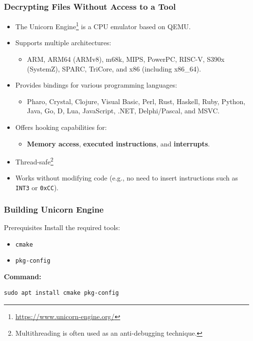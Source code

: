 \begin{frame}
    \frametitle{Decrypting Files Without Access to a Tool}
    \begin{itemize}
        \item The Unicorn Engine\footnote{\url{https://www.unicorn-engine.org/}} is a CPU emulator based on QEMU.
        \item Supports multiple architectures:
        \begin{itemize}
            \item ARM, ARM64 (ARMv8), m68k, MIPS, PowerPC, RISC-V, S390x (SystemZ), SPARC, TriCore, and x86 (including x86\_64).
        \end{itemize}
        \item Provides bindings for various programming languages:
        \begin{itemize}
            \item Pharo, Crystal, Clojure, Visual Basic, Perl, Rust, Haskell, Ruby, Python, Java, Go, D, Lua, JavaScript, .NET, Delphi/Pascal, and MSVC.
        \end{itemize}
        \item Offers hooking capabilities for:
        \begin{itemize}
            \item \textbf{Memory access}, \textbf{executed instructions}, and \textbf{interrupts}.
        \end{itemize}
        \item Thread-safe\footnote{Multithreading is often used as an anti-debugging technique.}
        \item Works without modifying code (e.g., no need to insert instructions such as \texttt{INT3} or \texttt{0xCC}).
    \end{itemize}
\end{frame}

\begin{frame}[fragile]
\frametitle{Building Unicorn Engine}
\begin{block}{Prerequisites}
    Install the required tools:
    \begin{itemize}
        \item \texttt{cmake}
        \item \texttt{pkg-config}
    \end{itemize}
    \textbf{Command:}
    \begin{verbatim}
sudo apt install cmake pkg-config
    \end{verbatim}
\end{block}

\end{frame}

